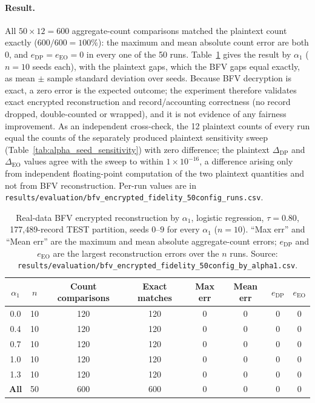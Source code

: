 \documentclass[a4paper,fleqn]{cas-dc}
\begin{document}
\paragraph{Result.} All $50\times12=600$ aggregate-count comparisons matched the plaintext count exactly ($600/600=100\%$): the maximum and mean absolute count error are both $0$, and $e_{\mathrm{DP}}=e_{\mathrm{EO}}=0$ in every one of the 50 runs. Table~\ref{tab:bfv_realdata_by_alpha} gives the result by $\alpha_1$ ($n=10$ seeds each), with the plaintext gaps, which the BFV gaps equal exactly, as mean $\pm$ sample standard deviation over seeds. Because BFV decryption is exact, a zero error is the expected outcome; the experiment therefore validates exact encrypted reconstruction and record/accounting correctness (no record dropped, double-counted or wrapped), and it is not evidence of any fairness improvement. As an independent cross-check, the 12 plaintext counts of every run equal the counts of the separately produced plaintext sensitivity sweep (Table~\ref{tab:alpha_seed_sensitivity}) with zero difference; the plaintext $\Delta_{\mathrm{DP}}$ and $\Delta_{\mathrm{EO}}$ values agree with the sweep to within $1\times10^{-16}$, a difference arising only from independent floating-point computation of the two plaintext quantities and not from BFV reconstruction. Per-run values are in \texttt{results/evaluation/bfv\_encrypted\_fidelity\_50config\_runs.csv}.

\begin{table}[htbp]
\centering
\caption{Real-data BFV encrypted reconstruction by $\alpha_1$, logistic regression, $\tau=0.80$, 177{,}489-record TEST partition, seeds $0$--$9$ for every $\alpha_1$ ($n=10$). ``Max err'' and ``Mean err'' are the maximum and mean absolute aggregate-count errors; $e_{\mathrm{DP}}$ and $e_{\mathrm{EO}}$ are the largest reconstruction errors over the $n$ runs. Source: \texttt{results/evaluation/bfv\_encrypted\_fidelity\_50config\_by\_alpha1.csv}.}
\label{tab:bfv_realdata_by_alpha}
\scriptsize
\begin{tabular}{|c|c|c|c|c|c|c|c|}
\hline
$\alpha_1$ & $n$ & Count comparisons & Exact matches & Max err & Mean err & $e_{\mathrm{DP}}$ & $e_{\mathrm{EO}}$ \\
\hline
0.0 & 10 & 120 & 120 & 0 & 0 & 0 & 0 \\
0.4 & 10 & 120 & 120 & 0 & 0 & 0 & 0 \\
0.7 & 10 & 120 & 120 & 0 & 0 & 0 & 0 \\
1.0 & 10 & 120 & 120 & 0 & 0 & 0 & 0 \\
1.3 & 10 & 120 & 120 & 0 & 0 & 0 & 0 \\
\hline
\textbf{All} & 50 & 600 & 600 & 0 & 0 & 0 & 0 \\
\hline
\end{tabular}
\end{table}
\end{document}
